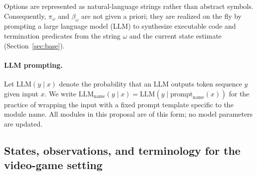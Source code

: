 \documentclass[11pt]{article}
\newcommand{\llm}[1]{\mathrm{LLM}_{\mathrm{#1}}}
\begin{document}
Options are represented as natural-language strings rather than abstract symbols. Consequently, $\pi_\omega$ and $\beta_\omega$ are not given a priori; they are realized on the fly by prompting a large language model (LLM) to synthesize executable code and termination predicates from the string $\omega$ and the current state estimate (Section~\ref{sec:base}).

\paragraph{LLM prompting.}
Let $\mathrm{LLM}(y\mid x)$ denote the probability that an LLM outputs token sequence $y$ given input $x$. We write $\llm{name}(y\mid x)=\mathrm{LLM}(y\mid \mathrm{prompt}_{\mathrm{name}}(x))$ for the practice of wrapping the input with a fixed prompt template specific to the module $\mathrm{name}$. All modules in this proposal are of this form; no model parameters are updated.

\subsection{States, observations, and terminology for the video-game setting}
\label{sec:states}
\end{document}
